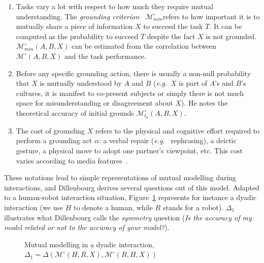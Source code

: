 \documentclass{sig-alternate}
\newcommand{\eg}{{\textit{e.g.~}}}
\newcommand{\Model}[3]{{$\mathcal{M}^{\circ}(#1, #2, #3)$}}
\newcommand{\groundingcriterion}{{$\mathcal{M}^{\circ}_{min}$}}
\begin{document}
\begin{enumerate}

    \item Tasks vary a lot with respect to how much they require mutual
        understanding.  The \emph{grounding criterion}~\cite{clark1986referring}
        \groundingcriterion refers to
        how important it is to mutually share a piece of information $X$ to
        succeed the task $T$. It can be computed as the probability to succeed $T$
        despite the fact $X$ is not grounded. $\mathcal{M}^{\circ}_{min}(A,B,X)$
        can be estimated from the correlation between \Model{A}{B}{X} and the task
        performance. 

    \item Before any specific grounding action, there is usually a non-null
        probability that $X$ is mutually understood by $A$ and $B$ (\eg $X$
        is part of $A$'s and $B$'s cultures, it is manifest to co-present
        subjects or simply there is not much space for misunderstanding
        or disagreement about $X$). He notes the theoretical accuracy of
        initial grounds $\mathcal{M}^{\circ}_{t_0}(A,B,X)$.

    \item The cost of grounding $X$ refers to the physical and cognitive effort
        required to perform a grounding act $\alpha$: a verbal repair (\eg
        rephrasing), a deictic gesture, a physical move to adopt one partner's
        viewpoint, etc. This cost varies according to media
        features~\cite{clark1991grounding}.

\end{enumerate}

These notations lead to simple representations of mutual modelling during
interactions, and Dillenbourg derives several questions out of this model.
Adapted to a human-robot interaction situation, Figure~\ref{mm_symmetry}
represents for instance a dyadic interaction (we use $H$ to denote a
human, while $R$ stands for a robot). $\Delta_1$ illustrates what Dillenbourg
calls the \emph{symmetry} question ({\it Is the accuracy of my model related or
not to the accuracy of your model?}).

\begin{figure}[htb]
\centering


\caption{\small Mutual modelling in a dyadic interaction, $\Delta_1 =
    \Delta(\mathcal{M}^{\circ} (H,R,X),
\mathcal{M}^{\circ} (R,H,X))$}

\label{mm_symmetry}
\end{figure}
\end{document}
